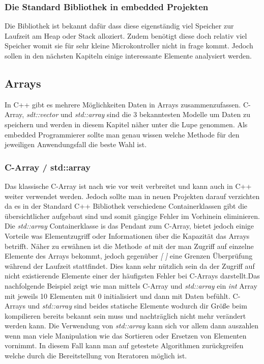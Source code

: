 \documentclass[MES,Master,ngerman]{twbook}%
\begin{document}
\subsubsection{Die Standard Bibliothek in embedded Projekten}
Die Bibliothek ist bekannt dafür dass diese eigenständig viel Speicher zur Laufzeit am Heap oder Stack alloziert. Zudem benötigt diese doch relativ viel Speicher womit sie für sehr kleine Microkontroller nicht in frage kommt. Jedoch sollen in den nächsten Kapiteln einige interessante Elemente analysiert werden.
\newpage

\subsection{Arrays}
In C++ gibt es mehrere Möglichkeiten Daten in Arrays zusammenzufassen. C-Array, \textit{sdt::vector} und \textit{std::array} sind die 3 bekanntesten Modelle um Daten zu speichern und werden in diesem Kapitel näher unter die Lupe genommen. Als embedded Programmierer sollte man genau wissen welche Methode für den jeweiligen Anwendungsfall die beste Wahl ist.

\subsubsection{C-Array / std::array}
Das klassische C-Array ist nach wie vor weit verbreitet und kann auch in C++ weiter verwendet werden. Jedoch sollte man in neuen Projekten darauf verzichten da es in der Standard C++ Bibliothek verschiedene Containerklassen gibt die übersichtlicher aufgebaut sind und somit gängige Fehler im Vorhinein eliminieren. Die \textit{std::array} Containerklasse is das Pendant zum C-Array, bietet jedoch einige Vorteile was Elementzugriff oder Informationen über die Kapazität das Arrays betrifft. Näher zu erwähnen ist die Methode \textit{at} mit der man Zugriff auf einzelne Elemente des Arrays bekommt, jedoch gegenüber \textit{[ ]} eine Grenzen Überprüfung während der Laufzeit stattfindet. Dies kann sehr nützlich sein da der Zugriff auf nicht existierende Elemente einer der häufigsten Fehler bei C-Arrays darstellt.\newline\newline Das nachfolgende Beispiel zeigt wie man mittels C-Array und \textit{std::array} ein \textit{int} Array mit jeweils 10 Elementen mit 0 initialisiert und dann mit Daten befühlt. C-Arrays und \textit{std::array} sind beides statische Elemente wodurch dir Größe beim kompilieren bereits bekannt sein muss und nachträglich nicht mehr verändert werden kann. Die Verwendung von \textit{std::array} kann sich vor allem dann auszahlen wenn man viele Manipulation wie das Sortieren oder Ersetzen von Elementen vornimmt. In diesem Fall kann man auf getestete Algorithmen zurückgreifen welche durch die Bereitstellung von Iteratoren möglich ist.
\end{document}

